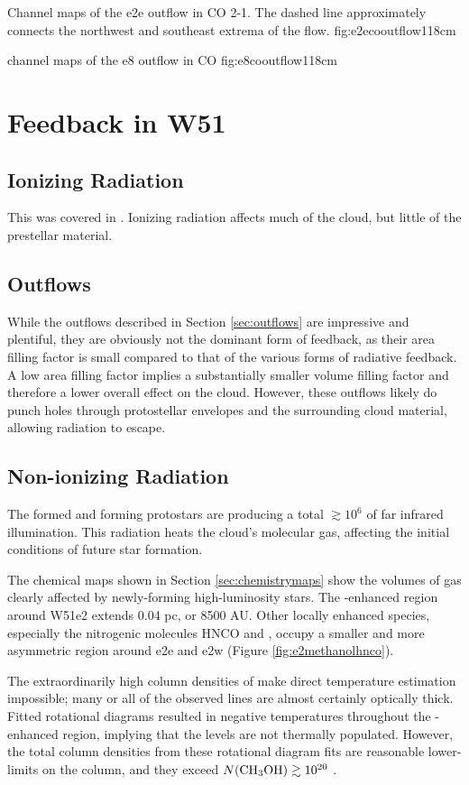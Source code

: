 \documentclass{aa}
\begin{document}
{Channel maps of the e2e outflow in CO 2-1.  The dashed line approximately
connects the northwest and southeast extrema of the flow.
{fig:e2ecooutflow}{1}{18cm}

{channel maps of the e8 outflow in CO}
{fig:e8cooutflow}{1}{18cm}

\section{Feedback in W51}
\subsection{Ionizing Radiation}
This was covered in \citep{Ginsburg2016b}.  Ionizing radiation affects much
of the cloud, but little of the prestellar material.

\subsection{Outflows}
While the outflows described in Section \ref{sec:outflows} are impressive and
plentiful, they are obviously not the dominant form of feedback, as their area
filling factor is small compared to that of the various forms of radiative
feedback.  A low area filling factor implies a substantially smaller volume
filling factor and therefore a lower overall effect on the cloud.  However,
these outflows likely do punch holes through protostellar envelopes and the
surrounding cloud material, allowing radiation to escape.

\subsection{Non-ionizing Radiation}
The formed and forming protostars are producing a total $\gtrsim10^6$ \lsun of
far infrared illumination.  This radiation heats the cloud's molecular gas,
affecting the initial conditions of future star formation.

The chemical maps shown in Section \ref{sec:chemistrymaps} show the volumes of
gas clearly affected by newly-forming high-luminosity stars.  The
\methanol-enhanced region around W51e2 extends 0.04 pc, or 8500 AU. Other
locally enhanced species, especially the nitrogenic molecules HNCO and
\formamide, occupy a smaller and more asymmetric region around e2e and e2w 
(Figure \ref{fig:e2methanolhnco}).

The extraordinarily high column densities of \methanol make direct temperature
estimation impossible; many or all of the observed \methanol lines are almost
certainly optically thick.  Fitted rotational diagrams resulted in negative
temperatures throughout the \methanol-enhanced region, implying that the levels
are not thermally populated.  However, the total column densities from these
rotational diagram fits are reasonable lower-limits on the column, and they
exceed $N(\textrm{CH}_3\textrm{OH})\gtrsim10^{20}$ \persc.

}
\end{document}
